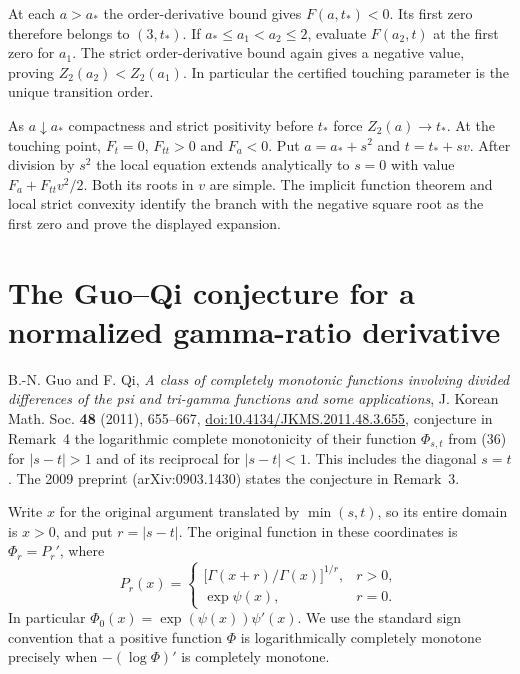\documentclass[11pt,a4paper]{article}
\numberwithin{equation}{section}
\begin{document}
At each $a>a_*$ the order-derivative bound gives $F(a,t_*)<0$.
Its first zero therefore belongs to $(3,t_*)$. If $a_*\le a_1<a_2\le2$,
evaluate $F(a_2,t)$ at the first zero for $a_1$. The strict
order-derivative bound again gives a negative value, proving
$Z_2(a_2)<Z_2(a_1)$. In particular the certified touching parameter
is the unique transition order.

As $a\downarrow a_*$ compactness and strict positivity before $t_*$
force $Z_2(a)\to t_*$. At the touching point, $F_t=0$, $F_{tt}>0$
and $F_a<0$. Put $a=a_*+s^2$ and $t=t_*+sv$. After division by $s^2$
the local equation extends analytically to $s=0$ with value
$F_a+F_{tt}v^2/2$. Both its roots in $v$ are simple. The implicit
function theorem and local strict convexity identify the branch with
the negative square root as the first zero and prove the displayed
expansion.


\section{The Guo--Qi conjecture for a normalized gamma-ratio derivative}
\label{sec:gqderiv}
B.-N. Guo and F. Qi, \emph{A class of completely monotonic functions
involving divided differences of the psi and tri-gamma functions and
some applications}, J. Korean Math. Soc. \textbf{48} (2011), 655--667,
\href{https://doi.org/10.4134/JKMS.2011.48.3.655}{doi:10.4134/JKMS.2011.48.3.655},
conjecture in Remark~4 the logarithmic complete monotonicity of their
function $\Phi_{s,t}$ from (36) for $|s-t|>1$ and of its reciprocal
for $|s-t|<1$. This includes the diagonal $s=t$. The 2009
preprint (arXiv:0903.1430) states the conjecture in Remark~3.

Write $x$ for the original argument translated by $\min(s,t)$,
so its entire domain is $x>0$, and put $r=|s-t|$. The original
function in these coordinates is $\Phi_r=P_r'$, where
\[
 P_r(x)=\begin{cases}
  \bigl[\Gamma(x+r)/\Gamma(x)\bigr]^{1/r}, & r>0,\\
  \exp\psi(x), &r=0 .
 \end{cases}
\]
In particular $\Phi_0(x)=\exp(\psi(x))\psi'(x)$.
We use the standard sign convention that a positive function
$\Phi$ is logarithmically completely monotone precisely when
$-(\log\Phi)'$ is completely monotone.
\end{document}
